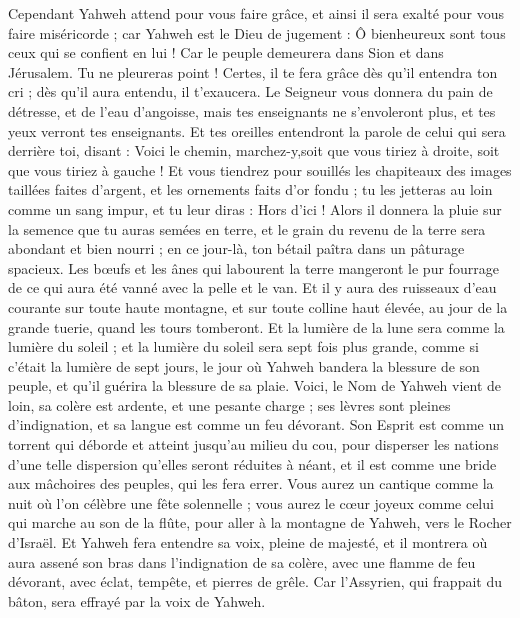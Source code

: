 \begin{multicols}{2}
Cependant Yahweh attend pour vous faire grâce, et ainsi il sera exalté pour vous faire miséricorde ; car Yahweh est le Dieu de jugement : Ô bienheureux sont tous ceux qui se confient en lui !
Car le peuple demeurera dans Sion et dans Jérusalem. Tu ne pleureras point ! Certes, il te fera grâce dès qu'il entendra ton cri ; dès qu'il aura entendu, il t'exaucera.
Le Seigneur vous donnera du pain de détresse, et de l'eau d'angoisse, mais tes enseignants ne s'envoleront plus, et tes yeux verront tes enseignants.
Et tes oreilles entendront la parole de celui qui sera derrière toi, disant : Voici le chemin, marchez-y,soit que vous tiriez à droite, soit que vous tiriez à gauche !
Et vous tiendrez pour souillés les chapiteaux des images taillées faites d'argent, et les ornements faits d'or fondu ; tu les jetteras au loin comme un sang impur, et tu leur diras : Hors d'ici ! 
Alors il donnera la pluie sur la semence que tu auras semées en terre, et le grain du revenu de la terre sera abondant et bien nourri ; en ce jour-là, ton bétail paîtra dans un pâturage spacieux.
Les bœufs et les ânes qui labourent la terre mangeront le pur fourrage de ce qui aura été vanné avec la pelle et le van.
Et il y aura des ruisseaux d'eau courante sur toute haute montagne, et sur toute colline haut élevée, au jour de la grande tuerie, quand les tours tomberont.
Et la lumière de la lune sera comme la lumière du soleil ; et la lumière du soleil sera sept fois plus grande, comme si c'était la lumière de sept jours, le jour où Yahweh bandera la blessure de son peuple, et qu'il guérira la blessure de sa plaie.
Voici, le Nom de Yahweh vient de loin, sa colère est ardente, et une pesante charge ; ses lèvres sont pleines d'indignation, et sa langue est comme un feu dévorant.
Son Esprit est comme un torrent qui déborde et atteint jusqu'au milieu du cou, pour disperser les nations d'une telle dispersion qu'elles seront réduites à néant, et il est comme une bride aux mâchoires des peuples, qui les fera errer.
Vous aurez un cantique comme la nuit où l'on célèbre une fête solennelle ; vous aurez le cœur joyeux comme celui qui marche au son de la flûte, pour aller à la montagne de Yahweh, vers le Rocher d'Israël.
Et Yahweh fera entendre sa voix, pleine de majesté, et il montrera où aura assené son bras dans l'indignation de sa colère, avec une flamme de feu dévorant, avec éclat, tempête, et pierres de grêle.
Car l'Assyrien, qui frappait du bâton, sera effrayé par la voix de Yahweh.

\end{multicols}
